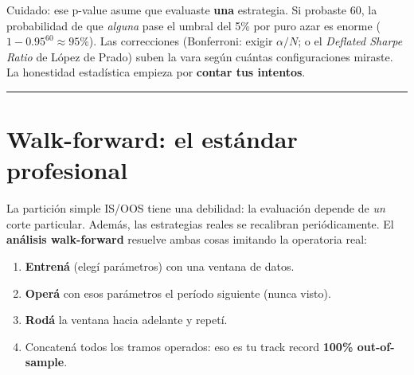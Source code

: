 \documentclass[
  spanish,
  letterpaper,
  DIV=11,
  numbers=noendperiod]{scrreprt}
\providecommand{\tightlist}{%
  \setlength{\itemsep}{0pt}\setlength{\parskip}{0pt}}
\begin{document}
\begin{tcolorbox}[enhanced jigsaw, bottomrule=.15mm, colback=white, opacitybacktitle=0.6, arc=.35mm, toprule=.15mm, opacityback=0, breakable, titlerule=0mm, left=2mm, coltitle=black, colbacktitle=quarto-callout-warning-color!10!white, colframe=quarto-callout-warning-color-frame, leftrule=.75mm, toptitle=1mm, bottomtitle=1mm, title=\textcolor{quarto-callout-warning-color}{\faExclamationTriangle}\hspace{0.5em}{El p-value con trampa múltiple}, rightrule=.15mm]

Cuidado: ese p-value asume que evaluaste \textbf{una} estrategia. Si
probaste 60, la probabilidad de que \emph{alguna} pase el umbral del 5\%
por puro azar es enorme (\(1 - 0.95^{60} \approx 95\%\)). Las
correcciones (Bonferroni: exigir \(\alpha/N\); o el \emph{Deflated
Sharpe Ratio} de López de Prado) suben la vara según cuántas
configuraciones miraste. La honestidad estadística empieza por
\textbf{contar tus intentos}.

\end{tcolorbox}

\begin{center}\rule{0.5\linewidth}{0.5pt}\end{center}

\chapter{Walk-forward: el estándar
profesional}\label{walk-forward-el-estuxe1ndar-profesional}

La partición simple IS/OOS tiene una debilidad: la evaluación depende de
\emph{un} corte particular. Además, las estrategias reales se recalibran
periódicamente. El \textbf{análisis walk-forward} resuelve ambas cosas
imitando la operatoria real:

\begin{enumerate}
\def\labelenumi{\arabic{enumi}.}
\tightlist
\item
  \textbf{Entrená} (elegí parámetros) con una ventana de datos.
\item
  \textbf{Operá} con esos parámetros el período siguiente (nunca visto).
\item
  \textbf{Rodá} la ventana hacia adelante y repetí.
\item
  Concatená todos los tramos operados: eso es tu track record
  \textbf{100\% out-of-sample}.
\end{enumerate}
\end{document}
